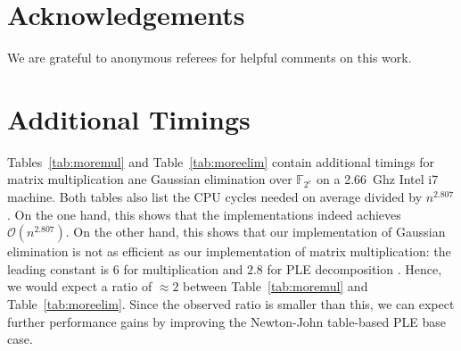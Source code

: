 \documentclass{sig-alternate}
\newcommand{\ring}[1]{\mathbb{#1}}
\newcommand{\FZE}{\ensuremath{\ring{F}_{2^e}}\xspace}
\newcommand{\ord}[1]{\ensuremath{\mathcal{O}\!\left(#1\right)}}
\newcommand{\mycomputer}{2.66~Ghz Intel i7\xspace}
\begin{document}
\section*{Acknowledgements} We are grateful to anonymous referees for helpful comments on this work.

\appendix
\section*{Additional Timings}

Tables~\ref{tab:moremul} and Table~\ref{tab:moreelim} contain additional timings for matrix multiplication ane Gaussian elimination over $\FZE$ on a \mycomputer machine. Both tables also list the  CPU cycles needed on average divided by $n^{2.807}$. On the one hand, this shows that the implementations indeed achieves $\ord{n^{2.807}}$. On the other hand, this shows that our implementation of Gaussian elimination is not as efficient as our implementation of matrix multiplication: the leading constant is $6$ for multiplication and $2.8$ for PLE decomposition \cite{jeannerod-pernet-storjohann:cup2012}. Hence, we would expect a ratio of $\approx 2$ between Table~\ref{tab:moremul} and Table~\ref{tab:moreelim}. Since the observed ratio is smaller than this, we can expect further performance gains by improving the Newton-John table-based PLE base case.
\end{document}
